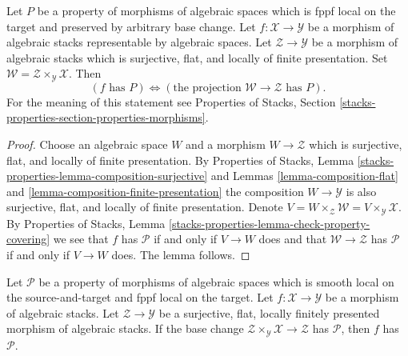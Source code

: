 \begin{lemma}
\label{lemma-check-property-after-fppf-base-change}
Let $P$ be a property of morphisms of algebraic spaces which is
fppf local on the target and preserved by arbitrary base change.
Let $f : \mathcal{X} \to \mathcal{Y}$ be a morphism of algebraic stacks
representable by algebraic spaces.
Let $\mathcal{Z} \to \mathcal{Y}$ be a morphism of algebraic stacks which
is surjective, flat, and locally of finite presentation.
Set $\mathcal{W} = \mathcal{Z} \times_\mathcal{Y} \mathcal{X}$. Then
$$
(f\text{ has }P) \Leftrightarrow
(\text{the projection }\mathcal{W} \to \mathcal{Z}\text{ has }P).
$$
For the meaning of this statement see
Properties of Stacks, Section
\ref{stacks-properties-section-properties-morphisms}.
\end{lemma}

\begin{proof}
Choose an algebraic space $W$ and a morphism
$W \to \mathcal{Z}$ which is surjective, flat, and locally of finite
presentation. By
Properties of Stacks, Lemma
\ref{stacks-properties-lemma-composition-surjective}
and Lemmas \ref{lemma-composition-flat} and
\ref{lemma-composition-finite-presentation}
the composition $W \to \mathcal{Y}$ is also surjective, flat, and
locally of finite presentation. Denote
$V = W \times_\mathcal{Z} \mathcal{W} = V \times_\mathcal{Y} \mathcal{X}$.
By Properties of Stacks, Lemma
\ref{stacks-properties-lemma-check-property-covering}
we see that $f$ has $\mathcal{P}$ if and only if $V \to W$ does
and that $\mathcal{W} \to \mathcal{Z}$ has $\mathcal{P}$ if and only
if $V \to W$ does. The lemma follows.
\end{proof}

\begin{lemma}
\label{lemma-descent-property}
Let $\mathcal{P}$ be a property of morphisms of algebraic spaces
which is smooth local on the source-and-target and fppf local
on the target.
Let $f : \mathcal{X} \to \mathcal{Y}$ be a morphism of algebraic stacks.
Let $\mathcal{Z} \to \mathcal{Y}$ be a surjective, flat, locally finitely
presented morphism of algebraic stacks. If the base change
$\mathcal{Z} \times_\mathcal{Y} \mathcal{X} \to \mathcal{Z}$
has $\mathcal{P}$, then $f$ has $\mathcal{P}$.
\end{lemma}

